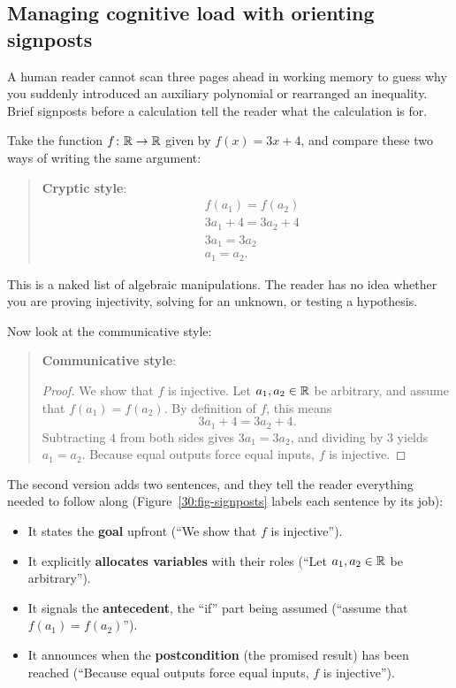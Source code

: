 \subsection{Managing cognitive load with orienting signposts}

A human reader cannot scan three pages ahead in working memory to guess why you suddenly introduced an auxiliary polynomial or rearranged an inequality. Brief signposts before a calculation tell the reader what the calculation is for.

Take the function $f\colon \mathbb{R} \to \mathbb{R}$ given by $f(x) = 3x + 4$, and compare these two ways of writing the same argument:

\begin{quote}
\textbf{Cryptic style}:
\[
\begin{aligned}
&f(a_1) = f(a_2) \\
&3a_1 + 4 = 3a_2 + 4 \\
&3a_1 = 3a_2 \\
&a_1 = a_2.
\end{aligned}
\]
\end{quote}
This is a naked list of algebraic manipulations. The reader has no idea whether you are proving injectivity, solving for an unknown, or testing a hypothesis.

Now look at the communicative style:

\begin{quote}
\textbf{Communicative style}:
\begin{proof}
We show that $f$ is injective. Let $a_1, a_2 \in \mathbb{R}$ be arbitrary, and assume that $f(a_1) = f(a_2)$. By definition of $f$, this means
\[
3a_1 + 4 = 3a_2 + 4.
\]
Subtracting $4$ from both sides gives $3a_1 = 3a_2$, and dividing by $3$ yields $a_1 = a_2$. Because equal outputs force equal inputs, $f$ is injective.
\end{proof}
\end{quote}

The second version adds two sentences, and they tell the reader everything needed to follow along (Figure~\ref{30:fig-signposts} labels each sentence by its job):
\begin{itemize}
\item It states the \textbf{goal} upfront (``We show that $f$ is injective'').
\item It explicitly \textbf{allocates variables} with their roles (``Let $a_1, a_2 \in \mathbb{R}$ be arbitrary'').
\item It signals the \textbf{antecedent}, the ``if'' part being assumed (``assume that $f(a_1) = f(a_2)$'').
\item It announces when the \textbf{postcondition} (the promised result) has been reached (``Because equal outputs force equal inputs, $f$ is injective'').
\end{itemize}

